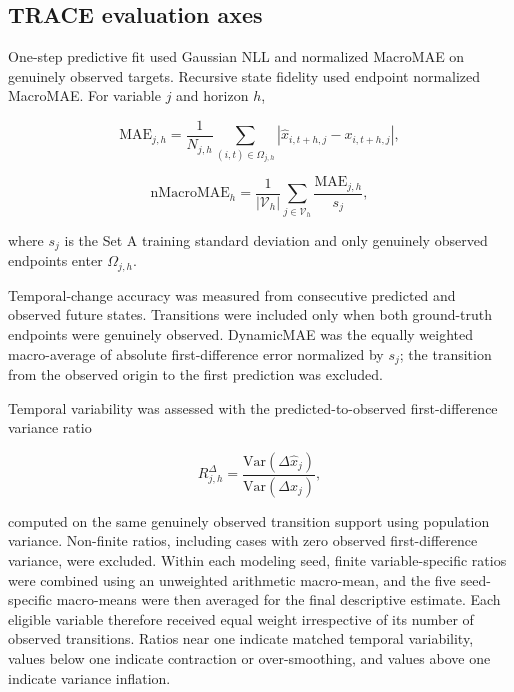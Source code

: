 \documentclass[preprint,12pt]{elsarticle}
\begin{document}
\subsection{TRACE evaluation axes}

One-step predictive fit used Gaussian NLL and normalized MacroMAE on
genuinely observed targets. Recursive state fidelity used endpoint
normalized MacroMAE. For variable $j$ and horizon $h$,

\begin{equation}
\mathrm{MAE}_{j,h}
=
\frac{1}{N_{j,h}}
\sum_{(i,t)\in\Omega_{j,h}}
\left|
\hat{x}_{i,t+h,j}-x_{i,t+h,j}
\right|,
\end{equation}

\begin{equation}
\mathrm{nMacroMAE}_{h}
=
\frac{1}{|\mathcal{V}_h|}
\sum_{j\in\mathcal{V}_h}
\frac{\mathrm{MAE}_{j,h}}{s_j},
\end{equation}

where $s_j$ is the Set A training standard deviation and only genuinely
observed endpoints enter $\Omega_{j,h}$.

Temporal-change accuracy was measured from consecutive predicted and
observed future states. Transitions were included only when both
ground-truth endpoints were genuinely observed. DynamicMAE was the
equally weighted macro-average of absolute first-difference error
normalized by $s_j$; the transition from the observed origin to the
first prediction was excluded.

Temporal variability was assessed with the predicted-to-observed
first-difference variance ratio

\begin{equation}
R^{\Delta}_{j,h}
=
\frac{\mathrm{Var}(\Delta\hat{x}_j)}
     {\mathrm{Var}(\Delta x_j)},
\end{equation}

computed on the same genuinely observed transition support using
population variance. Non-finite ratios, including cases with zero
observed first-difference variance, were excluded. Within each modeling
seed, finite variable-specific ratios were combined using an unweighted
arithmetic macro-mean, and the five seed-specific macro-means were then
averaged for the final descriptive estimate. Each eligible variable
therefore received equal weight irrespective of its number of observed
transitions. Ratios near one indicate matched temporal variability,
values below one indicate contraction or over-smoothing, and values
above one indicate variance inflation.
\end{document}
